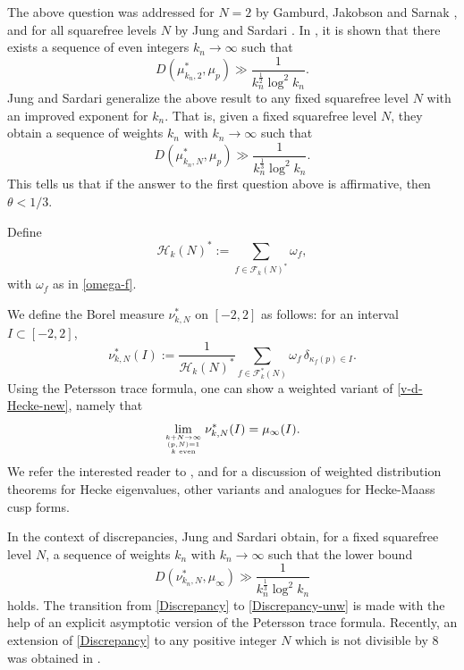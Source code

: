 \documentclass[reqno]{amsart}
\theoremstyle{plain}
\theoremstyle{definition}
\theoremstyle{remark}
\def\log{\operatorname{log}}
\begin{document}
The above question was addressed for $N=2$ by Gamburd, Jakobson and Sarnak \cite{GJS}, and for all squarefree levels $N$ by Jung and Sardari \cite{JS}.  In \cite{GJS}, it is shown that there exists a sequence of even integers $k_n \to \infty$ such that
\begin{equation}\label{Discrepancy-unw2}
D(\mu_{k_n,2}^*,\mu_p)\gg \frac{1}{k_n^{\frac{1}{2}}\log^2 k_n}.
\end{equation} 
Jung and Sardari \cite[Theorem 1.6]{JS} generalize the above result to any fixed squarefree level $N$ with an improved exponent for $k_n$.  That is, given a fixed squarefree level $N$, they obtain a sequence of weights $k_n$ with $k_n \rightarrow \infty $ such that
\begin{equation}\label{Discrepancy-unw}
D(\mu_{k_n,N}^*,\mu_p)\gg \frac{1}{k_n^{\frac{1}{3}}\log^2 k_n}.
\end{equation} 
This tells us that if the answer to the first question above is affirmative, then $\theta < 1/3$.

  
Define
$$\mathcal H_k(N)^* := \sum_{f \in \mathcal F_k(N)^*} \omega_f,$$
with $\omega_f$ as in \eqref{omega-f}.

We define the Borel measure $\nu_{k,N}^*$ on $[-2,2]$ as follows: for an interval $I \subset [-2,2]$, 
$$\nu_{k,N}^*(I):= \frac{1}{\mathcal H_k(N)^*}\sum_{f \in \mathcal{F}^*_k(N) } \omega_f \,\delta_{\kappa_f(p) \in I}.$$
Using the Petersson trace formula, one can show a weighted variant of \eqref{v-d-Hecke-new}, namely that
\begin{equation}\label{v-d-Hecke-new-weighted}
\lim_{k+N\rightarrow \infty \atop {(p,N) = 1 \atop{k \text{ even}}}} \nu_{k,N}^*(I) = \mu_{\infty}(I).
\end{equation}
We refer the interested reader to \cite{Li}, \cite{OM} and \cite{KL1} for a discussion of weighted distribution theorems for Hecke eigenvalues, other  variants and analogues for Hecke-Maass cusp forms.
 
 In the context of discrepancies, Jung and Sardari obtain, for a fixed squarefree level $N$, a sequence of weights $k_n$ with $k_n \rightarrow \infty $ such that the lower bound 
\begin{equation}\label{Discrepancy}
    D(\nu_{k_n,N}^*,\mu_\infty)\gg \frac{1}{k_n^{\frac{1}{3}}\log^2 k_n}
\end{equation}
holds. The transition from \eqref{Discrepancy} to \eqref{Discrepancy-unw} is made with the help of an explicit asymptotic version of the Petersson trace formula.  Recently, an extension of \eqref{Discrepancy} to any positive integer $N$ which is not divisible by $8$ was obtained in \cite[Theorem 1]{JD}. 
\end{document}
